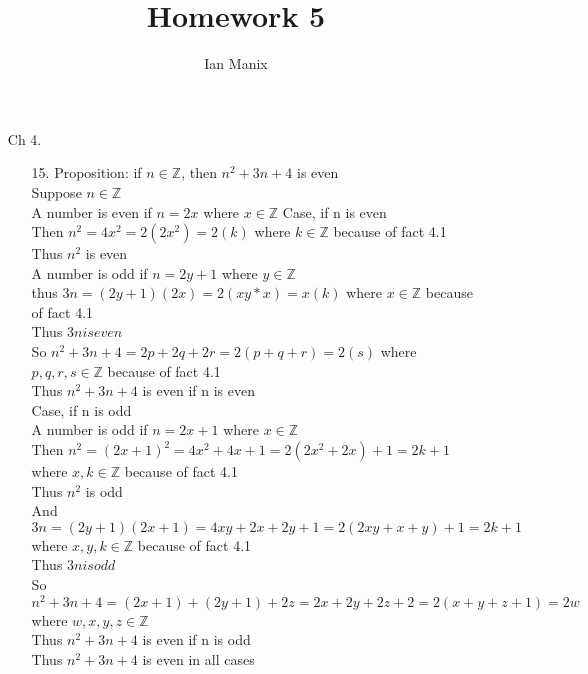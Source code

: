 \documentclass[sigconf]{article}
\title{
  \textbf{Homework 5} \\
  }
\author{ 
  Ian Manix
  }
\begin{document}



\maketitle





\begin{itemize}
  \item[Ch 4.] \begin{itemize}
      \item[15.]  Proposition: if $n \in \mathbb{Z}$, then $n^{2}+3n+4$ is even\\
                  Suppose $n\in\mathbb{Z}$\\
                  A number is even if $n=2x$ where $x\in\mathbb{Z}$
                  Case, if n is even\\
                  Then $n^2 = 4x^2 = 2(2x^2) = 2(k)$ where $k\in\mathbb{Z}$ because of fact 4.1\\
                  Thus $n^2$ is even\\
                  A number is odd if $n=2y+1$ where $y\in\mathbb{Z}$\\
                  thus $3n = (2y+1)(2x) = 2(xy*x) = x(k)$ where $x\in\mathbb{Z}$ because of fact 4.1\\
                  Thus $3n is even$\\
                  So $n^2+3n+4=2p+2q+2r=2(p+q+r)=2(s)$ where $p,q,r,s\in\mathbb{Z}$ because of fact 4.1\\
                  Thus $n^{2}+3n+4$ is even if n is even\\
                  Case, if n is odd\\
                  A number is odd if $n=2x+1$ where $x\in\mathbb{Z}$\\
                  Then $n^2=(2x+1)^2=4x^2+4x+1=2(2x^2+2x)+1=2k+1$ where $x,k\in\mathbb{Z}$ because of fact 4.1\\
                  Thus $n^2$ is odd\\
                  And $3n=(2y+1)(2x+1)=4xy+2x+2y+1=2(2xy+x+y)+1=2k+1$ where $x,y,k\in\mathbb{Z}$ because of fact 4.1\\
                  Thus $3n is odd$\\
                  So $n^2+3n+4=(2x+1)+(2y+1)+2z=2x+2y+2z+2=2(x+y+z+1)=2w$ where $w,x,y,z\in\mathbb{Z}$\\
                  Thus $n^{2}+3n+4$ is even if n is odd\\
                  Thus $n^{2}+3n+4$ is even in all cases


\end{itemize}
\end{itemize}
\end{document}
